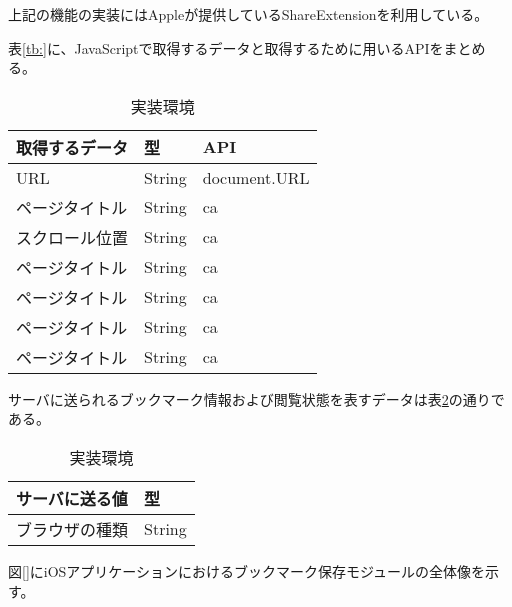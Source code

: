 上記の機能の実装にはAppleが提供しているShareExtension\cite{}を利用している。



表\ref{tb:}に、JavaScriptで取得するデータと取得するために用いるAPIをまとめる。

\begin{table}[htbp]
  \label{tb:ios-data-js-api}
  \caption{実装環境}
  \begin{center}
    \begin{tabular}{|l|l|l|}
    \hline
    取得するデータ & 型 & API \\ \hline
    URL & String & document.URL \\ \hline
    ページタイトル & String & ca \\ \hline
    スクロール位置 & String & ca \\ \hline
    ページタイトル & String & ca \\ \hline
    ページタイトル & String & ca \\ \hline
    ページタイトル & String & ca \\ \hline
    ページタイトル & String & ca \\ \hline
    \end{tabular}
  \end{center}
\end{table}



サーバに送られるブックマーク情報および閲覧状態を表すデータは表\ref{tb:ios-send-data-bookmark-save-module}の通りである。

\begin{table}[htbp]
  \label{tb:ios-send-data-bookmark-save-module}
  \caption{実装環境}
  \begin{center}
    \begin{tabular}{|l|l|}
    \hline
    サーバに送る値 & 型 \\ \hline
    ブラウザの種類 & String \\ \hline
    \end{tabular}
  \end{center}
\end{table}

図\ref{}にiOSアプリケーションにおけるブックマーク保存モジュールの全体像を示す。

